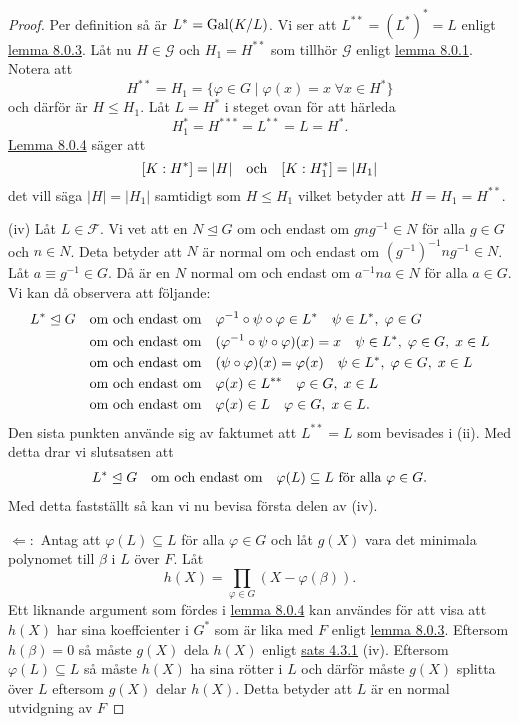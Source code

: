 \documentclass{article}
\newcommand{\gal}[0]{\textnormal{Gal}}
\theoremstyle{definition}
\begin{document}
\begin{proof}
  Per definition så är $L^* = \gal(K/L)$. Vi ser att $L^{**} = (L^*)^* = L$ enligt \hyperlink{lemma9.0.3}{lemma 8.0.3}. 
  Låt nu $H \in \mathcal{G}$ och $H_1 = H^{**}$ som tillhör $\mathcal{G}$ enligt \hyperlink{lemma9.0.1}{lemma 8.0.1}. Notera att 
  \[ H^{**} = H_1 = \{\varphi \in G \; | \; \varphi(x) = x \; \forall x \in H^*\} \]
  och därför är $H \leq H_1.$ Låt $L = H^*$ i steget ovan för att härleda
  \[H_1^* = H^{***} = L^{**} = L = H^*.\]
  \hyperlink{lemma9.0.4}{Lemma 8.0.4} säger att 
  \[ [K:H^*] = |H| \quad \textnormal{och} \quad [K:H_1^*] = |H_1| \]
  det vill säga $|H| = |H_1|$ samtidigt som $H \leq H_1$ vilket betyder att $H = H_1 = H^{**}$.

  (iv) Låt $L \in \mathcal{F}$. Vi vet att en $N \trianglelefteq G$ om och endast om $gng^{-1} \in N$ för alla $g \in G$ och $n \in N$. 
  Deta betyder att $N$ är normal om och endast om $(g^{-1})^{-1} n g^{-1} \in N$. Låt $a \equiv g^{-1} \in G$. 
  Då är en $N$ normal om och endast om $a^{-1}na \in N$ för alla $a \in G$.
  Vi kan då observera att följande: 
  \begin{align*}
    L^* \trianglelefteq G \quad &\textnormal{om och endast om} \quad \varphi^{-1} \circ \psi \circ \varphi \in L^* 
    \quad  \psi \in L^*, \; \varphi \in G \\
    &\textnormal{om och endast om} \quad (\varphi^{-1} \circ \psi \circ \varphi)(x) = x 
    \quad  \psi \in L^*, \; \varphi \in G, \; x \in L \\
    &\textnormal{om och endast om} \quad (\psi \circ \varphi) (x) = \varphi(x) 
    \quad  \psi \in L^*, \; \varphi \in G, \; x \in L \\
    &\textnormal{om och endast om} \quad \varphi(x) \in L^{**}
    \quad  \varphi \in G, \; x \in L \\
    &\textnormal{om och endast om} \quad \varphi(x) \in L
    \quad  \varphi \in G, \; x \in L.
  \end{align*}
  Den sista punkten använde sig av faktumet att $L^{**} = L$ som bevisades i (ii). Med detta drar vi slutsatsen att 
  \begin{align*}
    L^* \trianglelefteq G \quad \textnormal{om och endast om} \quad \varphi(L) \subseteq L \textnormal{ för alla } \varphi \in G.
  \end{align*}
  Med detta fastställt så kan vi nu bevisa första delen av (iv). 

  $\Leftarrow:$ Antag att $\varphi(L) \subseteq L$ för alla $\varphi \in G$ och låt $g(X)$ vara det minimala polynomet till $\beta$ i $L$ över $F$. Låt 
  \[h(X) = \prod_{\varphi \in G} (X - \varphi(\beta)).\]
  Ett liknande argument som fördes i \hyperlink{lemma9.0.4}{lemma 8.0.4} kan användes för att visa att $h(X)$ har sina koeffcienter i $G^*$
  som är lika med $F$ enligt \hyperlink{lemma9.0.3}{lemma 8.0.3}. Eftersom $h(\beta) = 0$ så måste $g(X)$ dela $h(X)$ enligt \hyperlink{minpol}{sats 4.3.1} (iv).
  Eftersom $\varphi(L) \subseteq L$ så måste $h(X)$ ha sina rötter i $L$ och därför måste $g(X)$ splitta över $L$ eftersom $g(X)$ delar $h(X)$. 
  Detta betyder att $L$ är en normal utvidgning av $F$


\end{proof}
\end{document}
